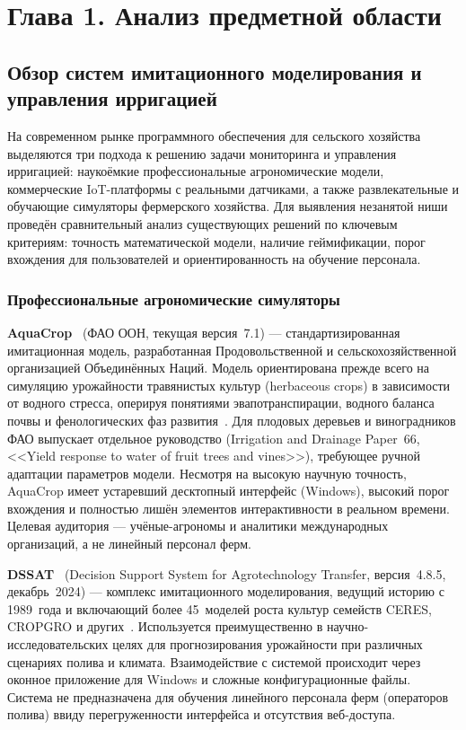 \section*{Глава 1. Анализ предметной области}

\subsection{Обзор систем имитационного моделирования и управления ирригацией}

На современном рынке программного обеспечения для сельского хозяйства
выделяются три подхода к решению задачи мониторинга и управления
ирригацией: наукоёмкие профессиональные агрономические модели,
коммерческие IoT-платформы с реальными датчиками, а также
развлекательные и обучающие симуляторы фермерского хозяйства.
Для выявления незанятой ниши проведён сравнительный анализ
существующих решений по ключевым критериям: точность математической
модели, наличие геймификации, порог вхождения для пользователей
и ориентированность на обучение персонала.

\subsubsection{Профессиональные агрономические симуляторы}

\textbf{AquaCrop}~\cite{aquacrop_fao} (ФАО ООН, текущая версия~7.1) ---
стандартизированная имитационная модель, разработанная Продовольственной
и сельскохозяйственной организацией Объединённых Наций. Модель
ориентирована прежде всего на симуляцию урожайности травянистых
культур (herbaceous crops) в зависимости от водного стресса, оперируя
понятиями эвапотранспирации, водного баланса почвы и фенологических
фаз развития~\cite{steduto2009_aquacrop}. Для плодовых деревьев и
виноградников ФАО выпускает отдельное руководство (Irrigation and
Drainage Paper~66, <<Yield response to water of fruit trees and vines>>),
требующее ручной адаптации параметров модели. Несмотря на высокую
научную точность, AquaCrop имеет устаревший десктопный интерфейс
(Windows), высокий порог вхождения и полностью лишён элементов
интерактивности в реальном времени. Целевая аудитория --- учёные-агрономы
и аналитики международных организаций, а не линейный персонал ферм.

\textbf{DSSAT}~\cite{dssat_net} (Decision Support System for
Agrotechnology Transfer, версия~4.8.5, декабрь~2024) --- комплекс
имитационного моделирования, ведущий историю с 1989~года и включающий
более 45~моделей роста культур семейств CERES, CROPGRO и
других~\cite{jones2003_dssat}. Используется преимущественно в
научно-исследовательских целях для прогнозирования урожайности при
различных сценариях полива и климата. Взаимодействие с системой
происходит через оконное приложение для Windows и сложные
конфигурационные файлы. Система не предназначена для обучения
линейного персонала ферм (операторов полива) ввиду перегруженности
интерфейса и отсутствия веб-доступа.

